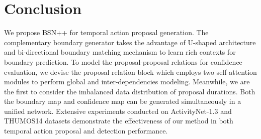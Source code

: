 \documentclass[letterpaper]{article} \usepackage{aaai21}  \usepackage{times}  \usepackage{helvet} \usepackage{courier}  \usepackage[hyphens]{url}  \usepackage{graphicx} \urlstyle{rm} \def\UrlFont{\rm}  \usepackage{natbib}  \usepackage{amsmath,amssymb} \usepackage{caption} \frenchspacing  \usepackage{color}
\begin{document}
\section{Conclusion}

We propose BSN++ for temporal action proposal generation. The complementary boundary generator takes the advantage of U-shaped architecture and bi-directional boundary matching mechanism to learn rich contexts for boundary prediction. To model the proposal-proposal relations for confidence evaluation, we devise the proposal relation block which employs two self-attention modules to perform global and inter-dependencies modeling. Meanwhile, we are the first to consider the imbalanced data distribution of proposal durations. Both the boundary map and confidence map can be generated simultaneously in a unified network. Extensive experiments conducted on ActivityNet-1.3 and THUMOS14 datasets demonstrate the effectiveness of our method in both temporal action proposal and detection performance.




\end{document}
